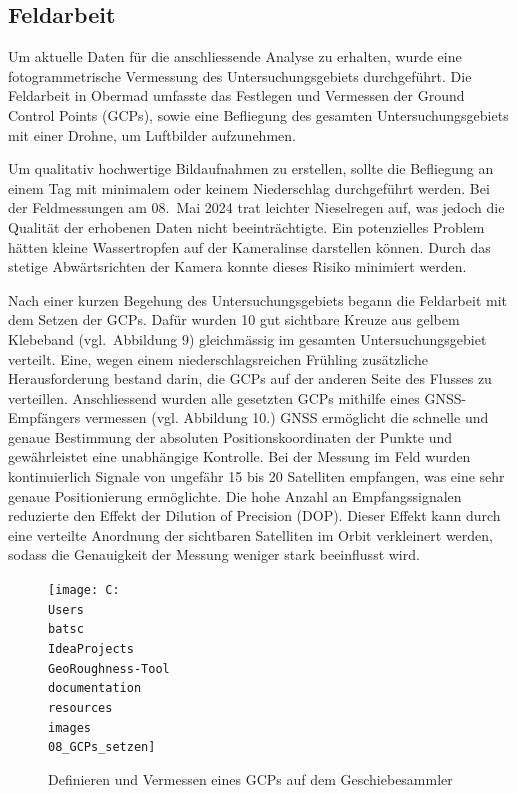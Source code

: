 \documentclass[12pt]{article}
\begin{document}
    \subsection{Feldarbeit}\label{subsec:feldarbeit}

        Um aktuelle Daten für die anschliessende Analyse zu erhalten, wurde eine fotogrammetrische Vermessung des Untersuchungsgebiets durchgeführt.
        Die Feldarbeit in Obermad umfasste das Festlegen und Vermessen der Ground Control Points (GCPs), sowie eine Befliegung des gesamten Untersuchungsgebiets mit einer Drohne, um Luftbilder aufzunehmen.

        Um qualitativ hochwertige Bildaufnahmen zu erstellen, sollte die Befliegung an einem Tag mit minimalem oder keinem Niederschlag durchgeführt werden.
        Bei der Feldmessungen am 08.\ Mai 2024 trat leichter Nieselregen auf, was jedoch die Qualität der erhobenen Daten nicht beeinträchtigte.
        Ein potenzielles Problem hätten kleine Wassertropfen auf der Kameralinse darstellen können.
        Durch das stetige Abwärtsrichten der Kamera konnte dieses Risiko minimiert werden.

        Nach einer kurzen Begehung des Untersuchungsgebiets begann die Feldarbeit mit dem Setzen der GCPs.
        Dafür wurden 10 gut sichtbare Kreuze aus gelbem Klebeband (vgl.\ Abbildung 9) gleichmässig im gesamten Untersuchungsgebiet verteilt. %
        Eine, wegen einem niederschlagsreichen Frühling zusätzliche Herausforderung bestand darin, die GCPs auf der anderen Seite des Flusses zu verteillen.
        Anschliessend wurden alle gesetzten GCPs mithilfe eines GNSS-Empfängers vermessen (vgl. Abbildung 10.) %
        GNSS ermöglicht die schnelle und genaue Bestimmung der absoluten Positionskoordinaten der Punkte und gewährleistet eine unabhängige Kontrolle.
        Bei der Messung im Feld wurden kontinuierlich Signale von ungefähr 15 bis 20 Satelliten empfangen, was eine sehr genaue Positionierung ermöglichte.
        Die hohe Anzahl an Empfangssignalen reduzierte den Effekt der Dilution of Precision (DOP).
        Dieser Effekt kann durch eine verteilte Anordnung der sichtbaren Satelliten im Orbit verkleinert werden, sodass die Genauigkeit der Messung weniger stark beeinflusst wird.

        \begin{figure}
            \centering
            \texttt{[image: C:\\Users\\batsc\\IdeaProjects\\GeoRoughness-Tool\\documentation\\resources\\images\\08\_GCPs\_setzen]}
            \caption{Definieren und Vermessen eines GCPs auf dem Geschiebesammler}
            \label{fig:08_gcps_setzen}
        \end{figure}
\end{document}
